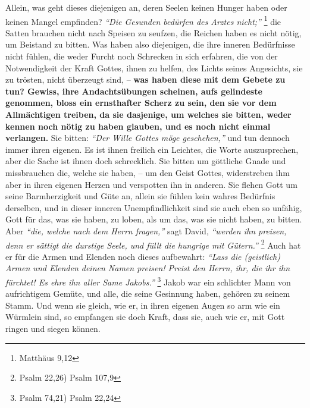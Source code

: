  Allein, was geht dieses
diejenigen an, deren Seelen keinen Hunger haben oder keinen Mangel empfinden?
\textit{"`Die Gesunden bedürfen des Arztes nicht;"'}
\footnote{Matthäus 9,12}
die Satten brauchen nicht nach Speisen zu
seufzen, die Reichen haben es nicht nötig, um Beistand zu bitten. Was haben also
diejenigen, die ihre inneren Bedürfnisse  nicht
fühlen, die weder Furcht noch
Schrecken in sich erfahren, die von der Notwendigkeit der Kraft Gottes, ihnen
zu helfen, des Lichts seines Angesichts, sie zu trösten, nicht
überzeugt sind, \label{ref:06_07_sinnlose_gebete}
-- \textbf{was haben diese mit dem Gebete zu tun? Gewiss, ihre Andachtsübungen
scheinen, aufs gelindeste genommen, bloss ein ernsthafter Scherz zu sein, den
sie vor dem Allmächtigen treiben, da sie dasjenige, um welches sie bitten, weder
kennen noch nötig zu haben glauben, und es noch nicht einmal verlangen.} Sie
bitten:
\textit{"`Der Wille Gottes möge geschehen,"'}
und tun dennoch immer ihren
eigenen. Es ist ihnen freilich ein
Leichtes, die Worte auszusprechen, aber die
Sache ist ihnen doch schrecklich. Sie bitten um göttliche Gnade und
missbrauchen die, welche sie haben, -- um den Geist Gottes, widerstreben ihm
aber in ihren eigenen Herzen und verspotten ihn in anderen.
Sie flehen Gott um
seine Barmherzigkeit und Güte an, allein sie fühlen kein wahres Bedürfnis
derselben, und in dieser inneren Unempfindlichkeit sind sie auch eben so
unfähig, Gott für das, was sie haben, zu loben, als um das, was sie nicht haben,
zu bitten. Aber  \textit{"`die, welche nach dem Herrn fragen,"'} sagt David,
\textit{"`werden ihn preisen, denn er sättigt die durstige Seele, und füllt
die hungrige mit Gütern."'}
\footnote{Psalm 22,26) Psalm 107,9}
Auch hat er für die Armen und Elenden
noch dieses aufbewahrt:
\textit{"`Lass die (geistlich) Armen und Elenden deinen
Namen
preisen! Preist den Herrn, ihr, die ihr ihn fürchtet! Es ehre ihn aller Same
Jakobs."'}
\footnote{Psalm 74,21) Psalm 22,24}
Jakob war ein schlichter Mann von
aufrichtigem Gemüte, und alle, die seine Gesinnung haben, gehören zu seinem
Stamm. Und wenn sie gleich, wie er, in ihren eigenen Augen so arm wie ein
Würmlein sind, so empfangen sie doch Kraft, dass sie, auch wie er, mit Gott
ringen und siegen können.

